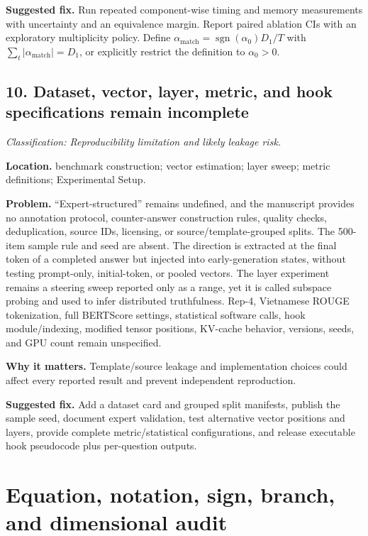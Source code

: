 \documentclass[11pt]{article}
\newcommand{\findinglabel}[1]{\textbf{#1}}
\newcommand{\classification}[1]{\textit{Classification: #1.}}
\begin{document}
\findinglabel{Suggested fix.} Run repeated component-wise timing and memory measurements with uncertainty and an equivalence margin.  Report paired ablation CIs with an exploratory multiplicity policy.  Define $\alpha_{\text{match}}=\operatorname{sgn}(\alpha_0)D_1/T$ with $\sum_t|\alpha_{\text{match}}|=D_1$, or explicitly restrict the definition to $\alpha_0>0$.

\subsection*{10. Dataset, vector, layer, metric, and hook specifications remain incomplete}

\classification{Reproducibility limitation and likely leakage risk}

\findinglabel{Location.} benchmark construction; vector estimation; layer sweep; metric definitions; Experimental Setup.

\findinglabel{Problem.} ``Expert-structured'' remains undefined, and the manuscript provides no annotation protocol, counter-answer construction rules, quality checks, deduplication, source IDs, licensing, or source/template-grouped splits.  The 500-item sample rule and seed are absent.  The direction is extracted at the final token of a completed answer but injected into early-generation states, without testing prompt-only, initial-token, or pooled vectors.  The layer experiment remains a steering sweep reported only as a range, yet it is called subspace probing and used to infer distributed truthfulness.  Rep-4, Vietnamese ROUGE tokenization, full BERTScore settings, statistical software calls, hook module/indexing, modified tensor positions, KV-cache behavior, versions, seeds, and GPU count remain unspecified.

\findinglabel{Why it matters.} Template/source leakage and implementation choices could affect every reported result and prevent independent reproduction.

\findinglabel{Suggested fix.} Add a dataset card and grouped split manifests, publish the sample seed, document expert validation, test alternative vector positions and layers, provide complete metric/statistical configurations, and release executable hook pseudocode plus per-question outputs.

\section*{Equation, notation, sign, branch, and dimensional audit}
\end{document}
